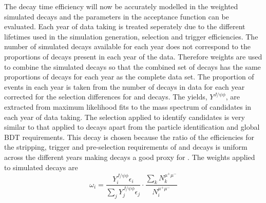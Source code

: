 The decay time efficiency will now be accurately modelled in the weighted simulated \bsmumu decays and the parameters in the acceptance function can be evaluated. Each year of data taking is treated seperately due to the different \bs lifetimes used in the simulation generation, selection and trigger efficiencies. The number of simulated decays available for each year does not correspond to the proportions of decays present in each year of the data. Therefore weights are used to combine the simulated decays so that the combined set of decays has the same proportions of decays for each year as the complete data set. 
The proportion of events in each year is taken from the number of \bsjpsiphi decays in data for each year corrected for the selection differences for \bsmumu and \bsjpsiphi decays. The \bsjpsiphi yields, $Y^{J/\psi \phi}$, are extracted from maximum likelihood fits to the mass spectrum of candidates in each year of data taking. The selection applied to identify \bsjpisphi candidates is very similar to that applied to \bsmumu decays apart from the particle identification and global BDT requirements. This decay is chosen because the ratio of the efficiencies for the stripping, trigger and pre-selection requirements of \bsmumu and \bsjpsiphi decays is uniform across the different years making \bsjpsiphi decays a good proxy for \bsmumu. 
The weights applied to simulated \bsmumu decays are
\begin{equation}
\omega_{i}  = \frac{Y_{i}^{J/\psi \phi} \epsilon_{i}}{\displaystyle\sum_{j} Y_{j}^{J/\psi \phi} \epsilon_{j}} \cdot \frac{\displaystyle\sum_{k} N_{k}^{\mu^{+}\mu^{-}}}{N_{i}^{\mu^{+}\mu^{-}}}
\end{equation}
